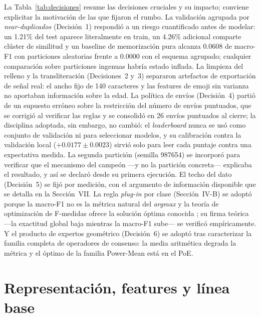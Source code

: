 \documentclass[journal]{IEEEtai}
\begin{document}
La Tabla~\ref{tab:decisiones} resume las decisiones cruciales y su impacto; conviene explicitar la
motivaci\'on de las que fijaron el rumbo. La validaci\'on agrupada por \textit{near-duplicados}
(Decisi\'on~1) respondi\'o a un riesgo cuantificado antes de modelar: un 1.21\% del test aparece
literalmente en train, un 4.26\% adicional comparte cl\'uster de similitud y un baseline de
memorizaci\'on pura alcanza 0.0608 de macro-F1 con particiones aleatorias frente a 0.0000 con el
esquema agrupado; cualquier comparaci\'on sobre particiones ingenuas habr\'ia estado inflada. La
limpieza del relleno y la transliteraci\'on (Decisiones~2 y~3) separaron artefactos de
exportaci\'on de se\~nal real: el ancho fijo de 140 caracteres y las features de emoji sin
varianza no aportaban informaci\'on sobre la edad. La pol\'itica de env\'ios (Decisi\'on~4)
parti\'o de un supuesto err\'oneo sobre la restricci\'on del n\'umero de env\'ios puntuados, que se corrigi\'o al verificar las reglas y se consolid\'o en 26 env\'ios puntuados al cierre; la disciplina adoptada, sin embargo, no cambi\'o: el \textit{leaderboard}
nunca se us\'o como conjunto de validaci\'on ni para seleccionar modelos, y su calibraci\'on
contra la validaci\'on local ($+0.0177 \pm 0.0023$) sirvi\'o solo para leer cada puntaje contra
una expectativa medida. La segunda partici\'on (semilla 987654) se incorpor\'o para verificar que
el mecanismo del campe\'on ---y no la partici\'on concreta--- explicaba el resultado, y as\'i se
declar\'o desde su primera ejecuci\'on. El techo del dato (Decisi\'on~5) se fij\'o por
medici\'on, con el argumento de informaci\'on disponible que se detalla en la Secci\'on~VII. La
regla \textit{plug-in} por clase (Secci\'on~IV-B) se adopt\'o porque la macro-F1 no es la
m\'etrica natural del \textit{argmax} y la teor\'ia de optimizaci\'on de F-medidas ofrece la
soluci\'on \'optima conocida \cite{lipton2014}; su firma te\'orica ---la exactitud global baja
mientras la macro-F1 sube--- se verific\'o emp\'iricamente. Y el producto de expertos
geom\'etrico (Decisi\'on~6) se adopt\'o tras caracterizar la familia completa de operadores de
consenso: la media aritm\'etica degrada la m\'etrica y el \'optimo de la familia Power-Mean
est\'a en el PoE.

\section{Representaci\'on, features y l\'inea base}
\end{document}
